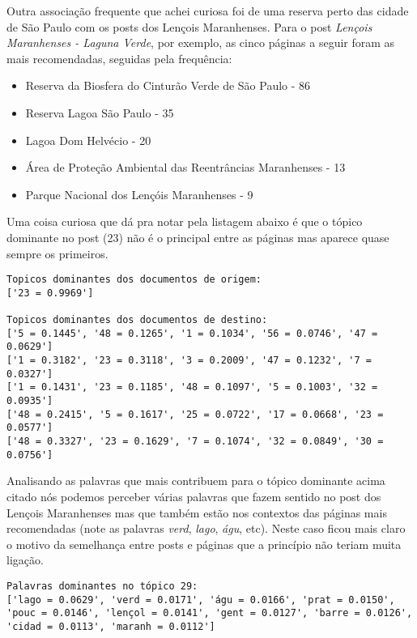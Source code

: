 Outra associação frequente que achei curiosa foi de uma reserva perto das cidade de São Paulo com os posts dos Lençois Maranhenses.
Para o post \textit{Lençois Maranhenses - Laguna Verde}, por exemplo, as cinco páginas a seguir foram as mais recomendadas, seguidas pela frequência:

\begin{itemize}
    \item Reserva da Biosfera do Cinturão Verde de São Paulo - 86
    \item Reserva Lagoa São Paulo - 35
    \item Lagoa Dom Helvécio - 20
    \item Área de Proteção Ambiental das Reentrâncias Maranhenses - 13
    \item Parque Nacional dos Lençóis Maranhenses - 9
\end{itemize}

Uma coisa curiosa que dá pra notar pela listagem abaixo é que o tópico dominante no post (23) não é o principal entre as páginas mas aparece quase 
sempre os primeiros.

\begin{lstlisting}
Topicos dominantes dos documentos de origem:
['23 = 0.9969']

Topicos dominantes dos documentos de destino:
['5 = 0.1445', '48 = 0.1265', '1 = 0.1034', '56 = 0.0746', '47 = 0.0629']
['1 = 0.3182', '23 = 0.3118', '3 = 0.2009', '47 = 0.1232', '7 = 0.0327']
['1 = 0.1431', '23 = 0.1185', '48 = 0.1097', '5 = 0.1003', '32 = 0.0935']
['48 = 0.2415', '5 = 0.1617', '25 = 0.0722', '17 = 0.0668', '23 = 0.0577']
['48 = 0.3327', '23 = 0.1629', '7 = 0.1074', '32 = 0.0849', '30 = 0.0756']
\end{lstlisting}

Analisando as palavras que mais contribuem para o tópico dominante acima citado nós podemos perceber várias palavras que fazem sentido no post dos 
Lençois Maranhenses mas que também estão nos contextos das páginas mais recomendadas (note as palavras \textit{verd}, \textit{lago}, 
\textit{águ}, etc). Neste caso ficou mais claro o motivo da semelhança entre posts e páginas que a princípio não teriam muita ligação.

\begin{lstlisting}
Palavras dominantes no tópico 29:
['lago = 0.0629', 'verd = 0.0171', 'águ = 0.0166', 'prat = 0.0150', 'pouc = 0.0146', 'lençol = 0.0141', 'gent = 0.0127', 'barre = 0.0126', 'cidad = 0.0113', 'maranh = 0.0112']
\end{lstlisting}